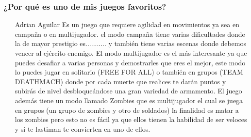 \subsubsection{¿Por qué es uno de mis juegos favoritos?}
\begin{itemize}
\item[Adrian Aguilar]Es un juego que requiere agilidad en movimientos ya sea en campaña o en multijugador. el modo campaña tiene varias dificultades donde la de mayor prestigio es........... y también tiene varias escenas donde debemos vencer al ejército enemigo. El modo multijugador es el más interesante ya que puedes desafiar a varias personas y demostrarles que eres el mejor, este modo lo puedes jugar en solitario (FREE FOR ALL) o también en grupos (TEAM DEATHMACH) donde por cada muerte que realices te darán puntos y subirás de nivel desbloqueándose una gran variedad de armamento. El juego además tiene un modo llamado Zombies que es multijugador el cual se juega en grupos (un grupo de zombies y otro de soldados) la finalidad es matar a los zombies pero esto no es fácil ya que ellos tienen la habilidad de ser veloces y si te lastiman te convierten en uno de ellos.
\end{itemize}